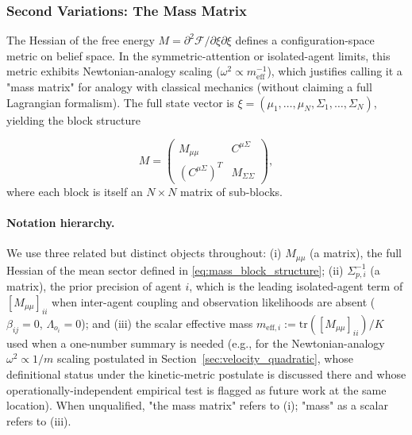 \documentclass[11pt]{article}
\begin{document}
\subsubsection{Second Variations: The Mass Matrix}

The Hessian of the free energy $M = \partial^2 \mathcal{F}/\partial\xi\partial\xi$ defines a configuration-space metric on belief space. In the symmetric-attention or isolated-agent limits, this metric exhibits Newtonian-analogy scaling ($\omega^2 \propto m_{\text{eff}}^{-1}$), which justifies calling it a "mass matrix" for analogy with classical mechanics (without claiming a full Lagrangian formalism). The full state vector is $\xi = (\mu_1, \ldots, \mu_N, \Sigma_1, \ldots, \Sigma_N)$, yielding the block structure

\begin{equation}
M = \begin{pmatrix} M_{\mu\mu} & C^{\mu\Sigma} \\ (C^{\mu\Sigma})^T & M_{\Sigma\Sigma} \end{pmatrix},
\label{eq:mass_block_structure}
\end{equation}
where each block is itself an $N \times N$ matrix of sub-blocks.

\paragraph{Notation hierarchy.}
We use three related but distinct objects throughout: (i) $M_{\mu\mu}$ (a matrix), the full Hessian of the mean sector defined in \eqref{eq:mass_block_structure}; (ii) $\Sigma_{p,i}^{-1}$ (a matrix), the prior precision of agent $i$, which is the leading isolated-agent term of $[M_{\mu\mu}]_{ii}$ when inter-agent coupling and observation likelihoods are absent ($\beta_{ij}=0$, $\Lambda_{o_i}=0$); and (iii) the scalar effective mass $m_{\text{eff},i} := \mathrm{tr}([M_{\mu\mu}]_{ii})/K$ used when a one-number summary is needed (e.g., for the Newtonian-analogy $\omega^2 \propto 1/m$ scaling postulated in Section~\ref{sec:velocity_quadratic}, whose definitional status under the kinetic-metric postulate is discussed there and whose operationally-independent empirical test is flagged as future work at the same location). When unqualified, "the mass matrix" refers to (i); "mass" as a scalar refers to (iii).
\end{document}
